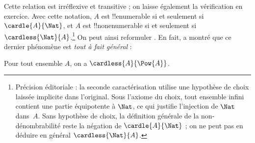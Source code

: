 \documentclass[11pt,a4paper,openany]{memoir}
\begin{document}
Cette relation est irréflexive et transitive ; on laisse également
la vérification en exercice. Avec cette notation, $A$ est
!!{enumerable} si et seulement si $\cardle{A}{\Nat}$, et $A$ est
!!{nonenumerable} si et seulement si $\cardless{\Nat}{A}$.\footnote{
Précision éditoriale : la seconde caractérisation utilise une
hypothèse de choix laissée implicite dans l'original. Sous l'axiome
du choix, tout ensemble infini contient une partie équipotente à
$\Nat$, ce qui justifie l'injection de $\Nat$ dans~$A$. Sans
hypothèse de choix, la définition générale de la non-dénombrabilité
reste la négation de $\cardle{A}{\Nat}$ ; on ne peut pas en déduire
en général $\cardless{\Nat}{A}$.}
On peut ainsi reformuler
.
En fait, \citet{Cantor1892} a montré que ce dernier phénomène est
\emph{tout à fait général} :

\begin{thm}[Cantor]
Pour tout ensemble $A$, on a $\cardless{A}{\Pow{A}}$.
\end{thm}
\end{document}
